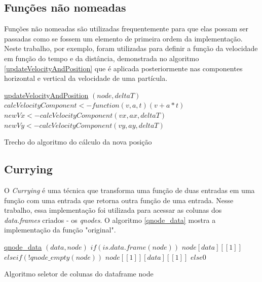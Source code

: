 \documentclass[rel_mlp]{iiufrgs}
\begin{document}
    \subsection{Funções não nomeadas}

    Funções não nomeadas são utilizadas frequentemente para que elas possam ser passadas como se fossem um elemento de primeira ordem da implementação. Neste trabalho, por exemplo, foram utilizadas para definir a função da velocidade em função do tempo e da distância, demonstrada no algoritmo \ref{updateVelocityAndPosition} que é aplicada posteriormente nas componentes horizontal e vertical da velocidade de uma partícula.

    \begin{algorithm}
	\label{updateVelocityAndPosition}
    \underline{updateVelocityAndPosition} $(node, deltaT)$\;
  		$calcVelocityComponent <- function (v, a, t) (v + a*t)$\;
    	$newVx <- calcVelocityComponent(vx, ax, deltaT)$\;
    	$newVy <- calcVelocityComponent(vy, ay, deltaT)$\;

\caption{Trecho do algoritmo do cálculo da nova posição}
\end{algorithm}

	\subsection{Currying}

    O \textit{Currying} é uma técnica que transforma uma função de duas entradas em uma função com uma entrada que retorna outra função de uma entrada. Nesse trabalho, essa implementação foi utilizada para acessar as colunas dos \textit{data.frames} criados - os \textit{qnodes}. O algoritmo \ref{qnode_data} mostra a implementação da função "original".
    \begin{algorithm}
	\label{qnode_data}
    \underline{qnode{\_}data} $(data, node)$\;
	$if(is.data.frame(node)) $\;
    $node[data][[1]] $\;
  	$else if(!qnode{\_}empty(node)) $\;
    $node[[1]][data][[1]] $\;
  	$else 0 $\;
	\caption{Algoritmo seletor de colunas do dataframe node}
	\end{algorithm}
\end{document}
